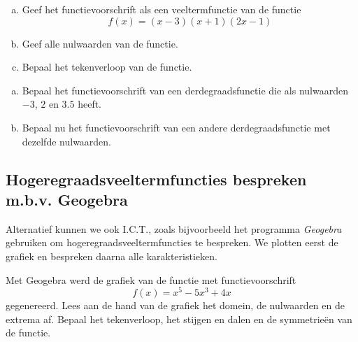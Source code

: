 \documentclass[12pt,twoside,a4paper]{article}
\begin{document}
\begin{oefening}
\begin{enumerate}[(a)]
  \item Geef het functievoorschrift als een veeltermfunctie van de functie
$$f(x)=(x-3)(x+1)(2x-1)$$
  \item Geef alle nulwaarden van de functie.
  \item Bepaal het tekenverloop van de functie.
\end{enumerate}
\end{oefening}

\begin{oefening}
\begin{enumerate}[(a)]
  \item Bepaal het functievoorschrift van een derdegraadsfunctie die als nulwaarden $-3$, $2$ en $3.5$ heeft.
  \item Bepaal nu het functievoorschrift van een andere derdegraadsfunctie met dezelfde nulwaarden.
\end{enumerate}
\end{oefening}

\subsection{Hogeregraadsveeltermfuncties bespreken m.b.v. Geogebra}
Alternatief kunnen we ook I.C.T., zoals bijvoorbeeld het programma {\em Geogebra} gebruiken om hogeregraadsveeltermfuncties te bespreken. We plotten eerst de grafiek en bespreken daarna alle karakteristieken.

\begin{oefening}
  Met Geogebra werd de grafiek van de functie met functievoorschrift
  $$f(x)=x^5-5x^3+4x$$
  gegenereerd. Lees aan de hand van de grafiek het domein, de nulwaarden en de extrema af. Bepaal het tekenverloop, het stijgen en dalen en de symmetrieën van de functie.\\
  \begin{center}
  \end{center}
\end{oefening}
\end{document}
